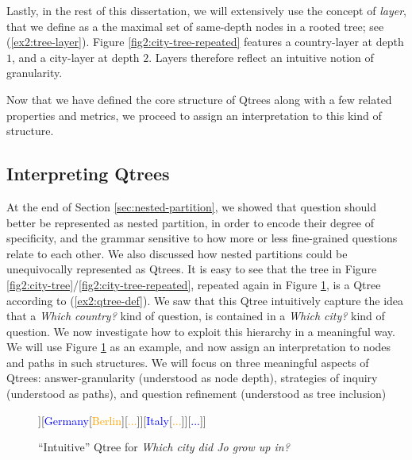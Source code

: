 Lastly, in the rest of this dissertation, we will extensively use the concept of \textit{layer}, that we define as a the maximal set of same-depth nodes in a rooted tree; see (\ref{ex2:tree-layer}). Figure \ref{fig2:city-tree-repeated} features a country-layer at depth $1$, and a city-layer at depth $2$. Layers therefore reflect an intuitive notion of granularity.

\begin{exe}
	\label{ex2:tree-layer}
\end{exe}


Now that we have defined the core structure of Qtrees along with a few related properties and metrics, we proceed to assign an interpretation to this kind of structure.

\subsection{Interpreting Qtrees}\label{sec:interpreting-qtrees}
\cite{Aloni2022}
At the end of Section \ref{sec:nested-partition}, we showed that question should better be represented as nested partition, in order to encode their degree of specificity, and the grammar sensitive to how more or less fine-grained questions relate to each other. We also discussed how nested partitions could be unequivocally represented as Qtrees. It is easy to see that the tree in Figure \ref{fig2:city-tree}/\ref{fig2:city-tree-repeated}, repeated again in Figure \ref{fig2:city-qtree}, is a Qtree according to (\ref{ex2:qtree-def}). We saw that this Qtree intuitively capture the idea that a \textit{Which country?} kind of question, is contained in a \textit{Which city?} kind of question. We now investigate how to exploit this hierarchy in a meaningful way. We will use Figure \ref{fig2:city-qtree} as an example, and now assign an interpretation to nodes and paths in such structures. We will focus on three meaningful aspects of Qtrees: answer-granularity (understood as node depth), strategies of inquiry (understood as paths), and question refinement (understood as tree inclusion)

\begin{figure}[H]
	\centering
	\begin{forest}
		[{CS\\
			Jo grew up in...}[\textcolor{blue}{France}[\textcolor{orange}{{Paris}}][\textcolor{orange}{Lyon}][\textcolor{orange}{...}]][\textcolor{blue}{Germany}[\textcolor{orange}{Berlin}][\textcolor{orange}{...}]][\textcolor{blue}{Italy}[\textcolor{orange}{...}]][\textcolor{blue}{...}]]
	\end{forest}
	\caption{``Intuitive'' Qtree for \textit{Which city did Jo grow up in?}}\label{fig2:city-qtree}
\end{figure}

